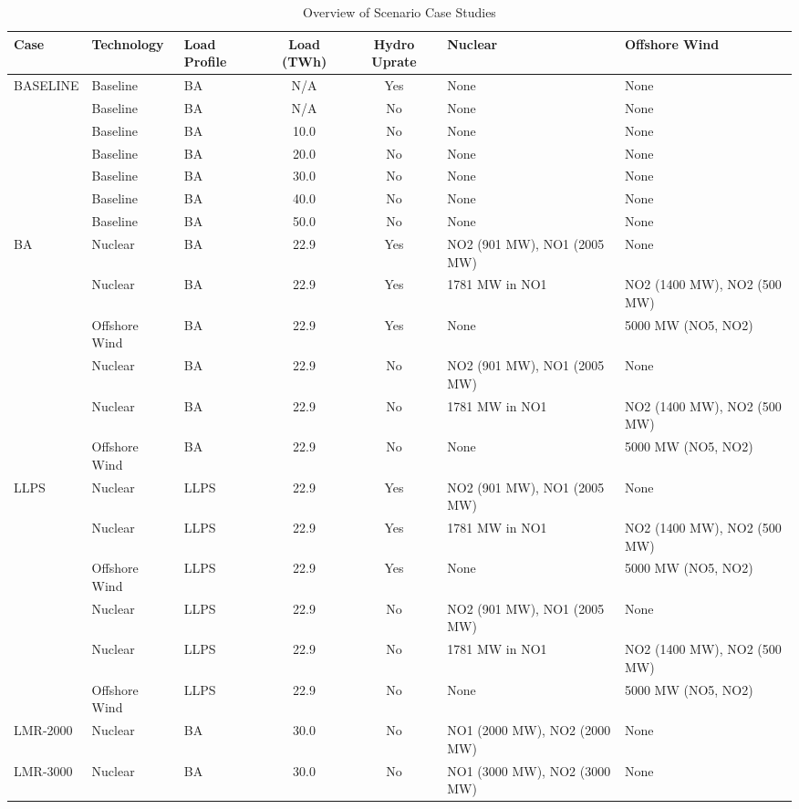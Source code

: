 \begin{table}[htbp]
\centering
\caption{Overview of Scenario Case Studies}
\label{tab:scenario_overview}
\small
\begin{tabular}{lllccll}
\hline
\textbf{Case} & \textbf{Technology} & \textbf{Load Profile} & \textbf{Load (TWh)} & \textbf{Hydro Uprate} & \textbf{Nuclear} & \textbf{Offshore Wind} \\
\hline
BASELINE & Baseline & BA & N/A & Yes & None & None \\
 & Baseline & BA & N/A & No & None & None \\
 & Baseline & BA & 10.0 & No & None & None \\
 & Baseline & BA & 20.0 & No & None & None \\
 & Baseline & BA & 30.0 & No & None & None \\
 & Baseline & BA & 40.0 & No & None & None \\
 & Baseline & BA & 50.0 & No & None & None \\
\hline
BA & Nuclear & BA & 22.9 & Yes & NO2 (901 MW), NO1 (2005 MW) & None \\
 & Nuclear & BA & 22.9 & Yes & 1781 MW in NO1 & NO2 (1400 MW), NO2 (500 MW) \\
 & Offshore Wind & BA & 22.9 & Yes & None & 5000 MW (NO5, NO2) \\
 & Nuclear & BA & 22.9 & No & NO2 (901 MW), NO1 (2005 MW) & None \\
 & Nuclear & BA & 22.9 & No & 1781 MW in NO1 & NO2 (1400 MW), NO2 (500 MW) \\
 & Offshore Wind & BA & 22.9 & No & None & 5000 MW (NO5, NO2) \\
\hline
LLPS & Nuclear & LLPS & 22.9 & Yes & NO2 (901 MW), NO1 (2005 MW) & None \\
 & Nuclear & LLPS & 22.9 & Yes & 1781 MW in NO1 & NO2 (1400 MW), NO2 (500 MW) \\
 & Offshore Wind & LLPS & 22.9 & Yes & None & 5000 MW (NO5, NO2) \\
 & Nuclear & LLPS & 22.9 & No & NO2 (901 MW), NO1 (2005 MW) & None \\
 & Nuclear & LLPS & 22.9 & No & 1781 MW in NO1 & NO2 (1400 MW), NO2 (500 MW) \\
 & Offshore Wind & LLPS & 22.9 & No & None & 5000 MW (NO5, NO2) \\
\hline
LMR-2000 & Nuclear & BA & 30.0 & No & NO1 (2000 MW), NO2 (2000 MW) & None \\
\hline
LMR-3000 & Nuclear & BA & 30.0 & No & NO1 (3000 MW), NO2 (3000 MW) & None \\

\end{tabular}
\end{table}
